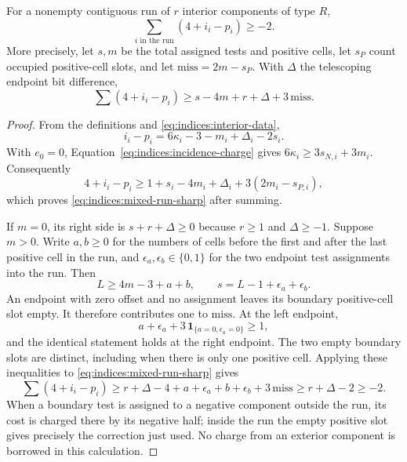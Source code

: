 \begin{lemma}\label{lem:indices:mixed-run}
For a nonempty contiguous run of $r$ interior components of type $R$,
\begin{equation}\label{eq:indices:mixed-run}
 \sum_{i\text{ in the run}}(4+i_i-p_i)\ge-2.
\end{equation}
More precisely, let $s,m$ be the total assigned tests and positive cells,
let $s_P$ count occupied positive-cell slots, and let
$\mathrm{miss}=2m-s_P$.  With $\Delta$ the telescoping endpoint bit
difference,
\begin{equation}\label{eq:indices:mixed-run-sharp}
 \sum(4+i_i-p_i)
 \ge s-4m+r+\Delta+3\,\mathrm{miss}.
\end{equation}
\end{lemma}
\begin{proof}
From the definitions and \eqref{eq:indices:interior-data},
\[
 i_i-p_i=6\kappa_i-3-m_i+\Delta_i-2s_i.
\]
With $e_0=0$, Equation~\eqref{eq:indices:incidence-charge} gives
$6\kappa_i\ge3s_{N,i}+3m_i$.  Consequently
\[
 4+i_i-p_i\ge
 1+s_i-4m_i+\Delta_i+3(2m_i-s_{P,i}),
\]
which proves \eqref{eq:indices:mixed-run-sharp} after summing.

If $m=0$, its right side is $s+r+\Delta\ge0$ because
$r\ge1$ and $\Delta\ge-1$.  Suppose $m>0$.  Write $a,b\ge0$ for the
numbers of cells before the first and after the last positive cell in
the run, and $\epsilon_a,\epsilon_b\in\{0,1\}$ for the two endpoint
test assignments into the run.  Then
\[
 L\ge4m-3+a+b,\qquad s=L-1+\epsilon_a+\epsilon_b.
\]
An endpoint with zero offset and no assignment leaves its boundary
positive-cell slot empty.  It therefore contributes one to
$\mathrm{miss}$.  At the left endpoint,
\[
 a+\epsilon_a+3\,\mathbf1_{\{a=0,\epsilon_a=0\}}\ge1,
\]
and the identical statement holds at the right endpoint.  The two
empty boundary slots are distinct, including when there is only one
positive cell.  Applying these inequalities to
\eqref{eq:indices:mixed-run-sharp} gives
\[
 \sum(4+i_i-p_i)
 \ge r+\Delta-4+a+\epsilon_a+b+\epsilon_b+3\,\mathrm{miss}
 \ge r+\Delta-2\ge-2.
\]
When a boundary test is assigned to a negative component outside the run,
its cost is charged there by its negative half; inside the run the empty
positive slot gives precisely the correction just used.  No charge from
an exterior component is borrowed in this calculation.
\end{proof}

